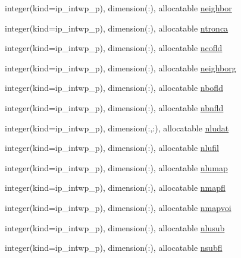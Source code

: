 \begin{DoxyCompactItemize}
\item 
integer(kind=ip\+\_\+intwp\+\_\+p), dimension(\+:), allocatable \hyperlink{namespacemod__oasis__namcouple_a298c9165785ae1a41f89597cadd211e7}{neighbor}
\item 
integer(kind=ip\+\_\+intwp\+\_\+p), dimension(\+:), allocatable \hyperlink{namespacemod__oasis__namcouple_aaf9fd5eaa5d115f2548b8f78cdcd172d}{ntronca}
\item 
integer(kind=ip\+\_\+intwp\+\_\+p), dimension(\+:), allocatable \hyperlink{namespacemod__oasis__namcouple_a9f8a2a4f44b1c56860fef8df014339d3}{ncofld}
\item 
integer(kind=ip\+\_\+intwp\+\_\+p), dimension(\+:), allocatable \hyperlink{namespacemod__oasis__namcouple_a883d88938c50264711c53af2b555c3db}{neighborg}
\item 
integer(kind=ip\+\_\+intwp\+\_\+p), dimension(\+:), allocatable \hyperlink{namespacemod__oasis__namcouple_a21400200658d24cbf7484b5eb177c911}{nbofld}
\item 
integer(kind=ip\+\_\+intwp\+\_\+p), dimension(\+:), allocatable \hyperlink{namespacemod__oasis__namcouple_af0c7b1e7e49159c6b9c0dc3663264346}{nbnfld}
\item 
integer(kind=ip\+\_\+intwp\+\_\+p), dimension(\+:,\+:), allocatable \hyperlink{namespacemod__oasis__namcouple_abb7c2cd3a371bbb8ccd6a272d0e9b60f}{nludat}
\item 
integer(kind=ip\+\_\+intwp\+\_\+p), dimension(\+:), allocatable \hyperlink{namespacemod__oasis__namcouple_a31f62f64cbcf344e529d0576386d0751}{nlufil}
\item 
integer(kind=ip\+\_\+intwp\+\_\+p), dimension(\+:), allocatable \hyperlink{namespacemod__oasis__namcouple_a42367b4984c6ac4c69cbdcd315cb54e6}{nlumap}
\item 
integer(kind=ip\+\_\+intwp\+\_\+p), dimension(\+:), allocatable \hyperlink{namespacemod__oasis__namcouple_ac623e3e0906f57983efc1ab912ce9674}{nmapfl}
\item 
integer(kind=ip\+\_\+intwp\+\_\+p), dimension(\+:), allocatable \hyperlink{namespacemod__oasis__namcouple_adb1f8ce6bf94f488c10ef36b3afb8eca}{nmapvoi}
\item 
integer(kind=ip\+\_\+intwp\+\_\+p), dimension(\+:), allocatable \hyperlink{namespacemod__oasis__namcouple_aefed5eaa9924d249e979a5a772a46979}{nlusub}
\item 
integer(kind=ip\+\_\+intwp\+\_\+p), dimension(\+:), allocatable \hyperlink{namespacemod__oasis__namcouple_a6a94577996b440c31cac5b7d39e7f47a}{nsubfl}
\item 

\end{DoxyCompactItemize}
